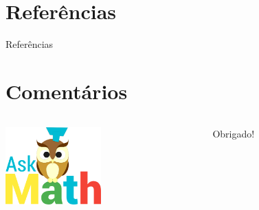 \documentclass[aspectratio=169]{beamer}
\begin{document}
\section{Referências}

\begin{frame}[allowframebreaks]{Referências}
	
\end{frame}


\section{Coment\'arios}

\begin{frame}
	\begin{columns}
		\begin{column}{3cm}
			\includegraphics[height=3cm]{figuras/logo.png}
		\end{column}
		\begin{column}{7cm}
			\begin{flushright}
				\centering
				\vskip 0.5cm
				\Huge Obrigado!
			\end{flushright}
		\end{column}
	\end{columns}
\end{frame}


\end{document}
